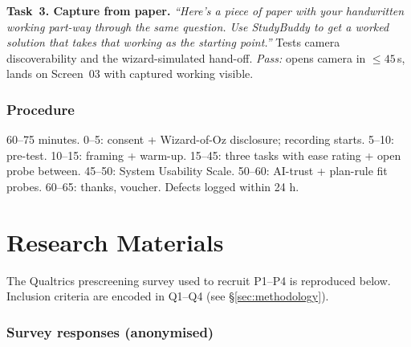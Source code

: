 \documentclass[a4paper,11pt]{article}
\begin{document}
\textbf{Task~3. Capture from paper.} \emph{``Here's a piece of paper
with your handwritten working part-way through the same question. Use
StudyBuddy to get a worked solution that takes that working as the
starting point.''} Tests camera discoverability and the
wizard-simulated hand-off. \emph{Pass:} opens camera in
${\leq}45$\,s, lands on Screen~03 with captured working visible.

\subsubsection*{Procedure}
60--75 minutes. 0--5: consent + Wizard-of-Oz disclosure; recording
starts. 5--10: pre-test. 10--15: framing + warm-up. 15--45: three
tasks with ease rating + open probe between. 45--50: System Usability
Scale. 50--60: AI-trust + plan-rule fit probes. 60--65: thanks,
voucher. Defects logged within 24 h.

\newpage
\nocite{*}
\printbibliography[heading=bibintoc]

\newpage
\appendix
{}

\section{Research Materials}\label{app:research-materials}
The Qualtrics prescreening survey used to recruit P1--P4 is reproduced
below. Inclusion criteria are encoded in Q1--Q4 (see \S\ref{sec:methodology}).


\subsubsection*{Survey responses (anonymised)}
\end{document}

